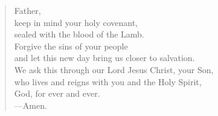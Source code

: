 \prayer

\setlength{\leftmargini}{\prayerleftmargini}

\begin{verse}
Father,\\
keep in mind your holy covenant,\\
sealed with the blood of the Lamb.\\
Forgive the sins of your people\\
and let this new day bring us closer to salvation.\\
We ask this through our Lord Jesus Christ, your Son,\\
who lives and reigns with you and the Holy Spirit,\\
God, for ever and ever.\\
{\color{red}---\thinspace}Amen.
\end{verse}

\setlength{\leftmargini}{\defleftmargini}